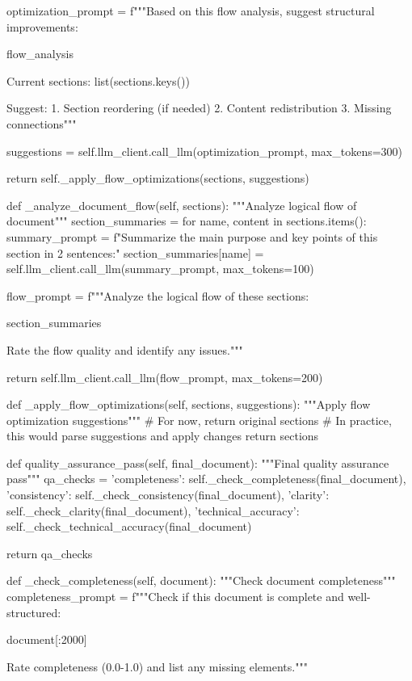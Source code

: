         optimization_prompt = f"""Based on this flow analysis, suggest structural improvements:

{flow_analysis}

Current sections: {list(sections.keys())}

Suggest:
1. Section reordering (if needed)
2. Content redistribution
3. Missing connections"""
        
        suggestions = self.llm_client.call_llm(optimization_prompt, max_tokens=300)
        
        return self._apply_flow_optimizations(sections, suggestions)
    
    def _analyze_document_flow(self, sections):
        """Analyze logical flow of document"""
        section_summaries = {}
        for name, content in sections.items():
            summary_prompt = f"Summarize the main purpose and key points of this section in 2 sentences:\n{}"
            section_summaries[name] = self.llm_client.call_llm(summary_prompt, max_tokens=100)
        
        flow_prompt = f"""Analyze the logical flow of these sections:

{section_summaries}

Rate the flow quality and identify any issues."""
        
        return self.llm_client.call_llm(flow_prompt, max_tokens=200)
    
    def _apply_flow_optimizations(self, sections, suggestions):
        """Apply flow optimization suggestions"""
        # For now, return original sections
        # In practice, this would parse suggestions and apply changes
        return sections
    
    def quality_assurance_pass(self, final_document):
        """Final quality assurance pass"""
        qa_checks = {
            'completeness': self._check_completeness(final_document),
            'consistency': self._check_consistency(final_document),
            'clarity': self._check_clarity(final_document),
            'technical_accuracy': self._check_technical_accuracy(final_document)
        }
        
        return qa_checks
    
    def _check_completeness(self, document):
        """Check document completeness"""
        completeness_prompt = f"""Check if this document is complete and well-structured:

{document[:2000]}

Rate completeness (0.0-1.0) and list any missing elements."""
        

